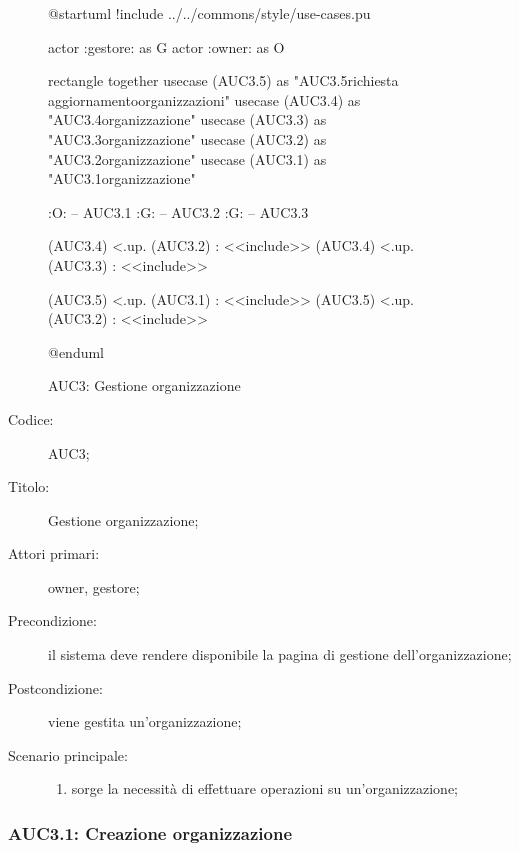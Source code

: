 \documentclass[../../../analisi-dei-requisiti.tex]{subfiles}
\begin{document}
\begin{figure}[H]
  \centering
  \begin{plantuml}
    @startuml
    !include ../../commons/style/use-cases.pu

    actor :gestore: as G
    actor :owner: as O

    rectangle {
        together {
            usecase (AUC3.5) as "AUC3.5\nInvio richiesta aggiornamento\nlista organizzazioni"
            usecase (AUC3.4) as "AUC3.4\nSeleziona organizzazione"
            usecase (AUC3.3) as "AUC3.3\nModifica organizzazione"
            usecase (AUC3.2) as "AUC3.2\nEliminazione organizzazione"
            usecase (AUC3.1) as "AUC3.1\nCreazione organizzazione"
          }
      }

    :O: -- AUC3.1
    :G: -- AUC3.2
    :G: -- AUC3.3

    (AUC3.4) <.up. (AUC3.2) : <<include>>
    (AUC3.4) <.up. (AUC3.3) : <<include>>

    (AUC3.5) <.up. (AUC3.1) : <<include>>
    (AUC3.5) <.up. (AUC3.2) : <<include>>

    @enduml
  \end{plantuml}
  \caption{AUC3: Gestione organizzazione}%
  \label{fig:AUC3}
\end{figure}

\begin{description}
  \item[Codice:] AUC3;
  \item[Titolo:] Gestione organizzazione;
  \item[Attori primari:] owner, gestore;
  \item[Precondizione:] il sistema deve rendere disponibile la pagina di gestione dell'organizzazione;
  \item[Postcondizione:] viene gestita un'organizzazione;
  \item[Scenario principale:]
        \begin{enumerate}
          \item sorge la necessità di effettuare operazioni su un'organizzazione;
        \end{enumerate}
\end{description}

\subsubsection{AUC3.1: Creazione organizzazione}%
\label{subs:AUC3.1}
\end{document}
